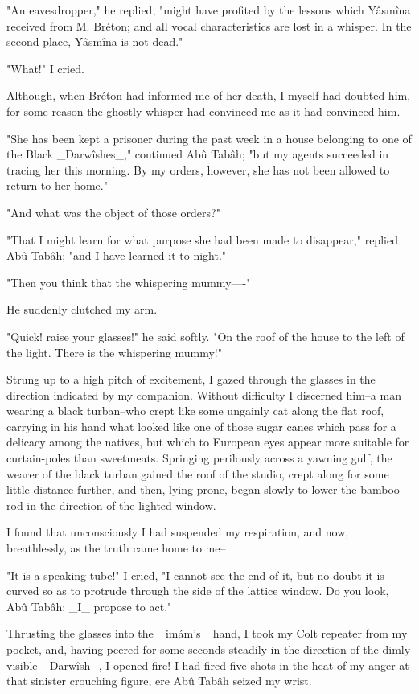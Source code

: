 "An eavesdropper," he replied, "might have profited by the lessons
which Yâsmîna received from M. Bréton; and all vocal characteristics
are lost in a whisper. In the second place, Yâsmîna is not dead."

"What!" I cried.

Although, when Bréton had informed me of her death, I myself had
doubted him, for some reason the ghostly whisper had convinced me as
it had convinced him.

"She has been kept a prisoner during the past week in a house
belonging to one of the Black _Darwîshes_," continued Abû Tabâh; "but
my agents succeeded in tracing her this morning. By my orders,
however, she has not been allowed to return to her home."

"And what was the object of those orders?"

"That I might learn for what purpose she had been made to disappear,"
replied Abû Tabâh; "and I have learned it to-night."

"Then you think that the whispering mummy----"

He suddenly clutched my arm.

"Quick! raise your glasses!" he said softly. "On the roof of the house
to the left of the light. There is the whispering mummy!"

Strung up to a high pitch of excitement, I gazed through the glasses
in the direction indicated by my companion. Without difficulty I
discerned him--a man wearing a black turban--who crept like some
ungainly cat along the flat roof, carrying in his hand what looked
like one of those sugar canes which pass for a delicacy among the
natives, but which to European eyes appear more suitable for
curtain-poles than sweetmeats. Springing perilously across a yawning
gulf, the wearer of the black turban gained the roof of the studio,
crept along for some little distance further, and then, lying prone,
began slowly to lower the bamboo rod in the direction of the lighted
window.

I found that unconsciously I had suspended my respiration, and now,
breathlessly, as the truth came home to me--

"It is a speaking-tube!" I cried, "I cannot see the end of it, but no
doubt it is curved so as to protrude through the side of the lattice
window. Do you look, Abû Tabâh: _I_ propose to act."

Thrusting the glasses into the _imám's_ hand, I took my Colt repeater
from my pocket, and, having peered for some seconds steadily in the
direction of the dimly visible _Darwîsh_, I opened fire! I had fired
five shots in the heat of my anger at that sinister crouching figure,
ere Abû Tabâh seized my wrist.

